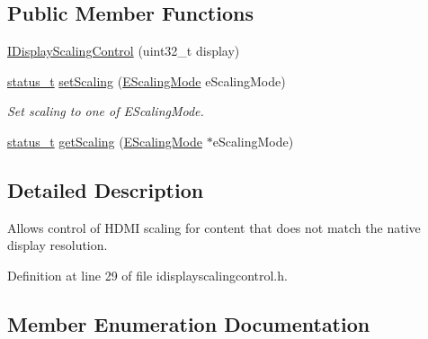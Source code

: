 \subsection*{Public Member Functions}
\begin{DoxyCompactItemize}
\item 
\mbox{\hyperlink{classhwcomposer_1_1IDisplayScalingControl_a391bcc762fddd62b28b41c132e45eaf6}{I\+Display\+Scaling\+Control}} (uint32\+\_\+t display)
\item 
\mbox{\hyperlink{hwcserviceapi_8h_a3806fb2027d9a316d8ca8d9b8b8eb96f}{status\+\_\+t}} \mbox{\hyperlink{classhwcomposer_1_1IDisplayScalingControl_a424df506846f2347ec0d442227105735}{set\+Scaling}} (\mbox{\hyperlink{classhwcomposer_1_1IDisplayScalingControl_a96b7ad3bec70da200ece1cd815807aab}{E\+Scaling\+Mode}} e\+Scaling\+Mode)
\begin{DoxyCompactList}\small\item\em Set scaling to one of E\+Scaling\+Mode. \end{DoxyCompactList}\item 
\mbox{\hyperlink{hwcserviceapi_8h_a3806fb2027d9a316d8ca8d9b8b8eb96f}{status\+\_\+t}} \mbox{\hyperlink{classhwcomposer_1_1IDisplayScalingControl_ae95df0ea1728944684b91a80d0d9d6d0}{get\+Scaling}} (\mbox{\hyperlink{classhwcomposer_1_1IDisplayScalingControl_a96b7ad3bec70da200ece1cd815807aab}{E\+Scaling\+Mode}} $\ast$e\+Scaling\+Mode)
\end{DoxyCompactItemize}


\subsection{Detailed Description}
Allows control of H\+D\+MI scaling for content that does not match the native display resolution. 

Definition at line 29 of file idisplayscalingcontrol.\+h.



\subsection{Member Enumeration Documentation}
\mbox{\label{classhwcomposer_1_1IDisplayScalingControl_a96b7ad3bec70da200ece1cd815807aab}} 
